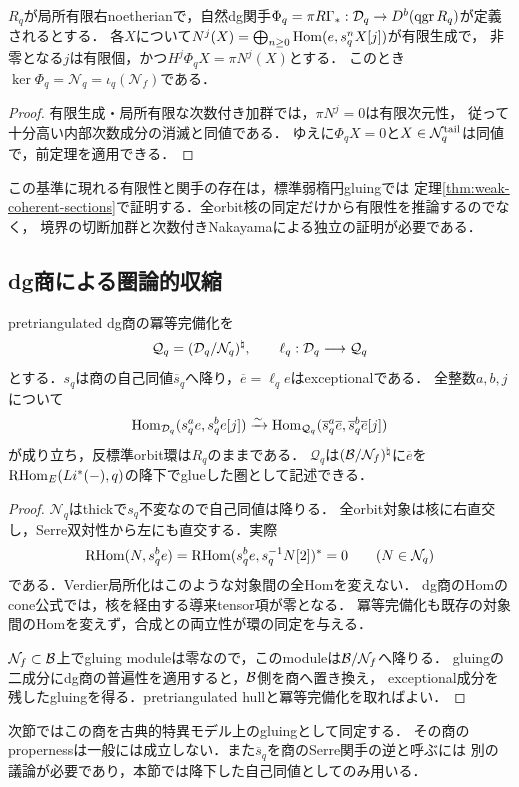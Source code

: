\begin{proposition}[coherent導来切断の核を認識する基準]\label{prop:weak-coherent-kernel}
$R_q$が局所有限右noetherianで，自然dg関手$\Phi_q=\pi R\Gamma_*:\mathcal D_q\to D^b(\operatorname{qgr} R_q)$が定義されるとする．
各$X$について$N^j(X)=\bigoplus_{n\ge0}\operatorname{Hom}(e,s_q^nX[j])$が有限生成で，
非零となる$j$は有限個，かつ$H^j\Phi_qX=\pi N^j(X)$とする．
このとき$\ker\Phi_q=\mathcal N_q=\iota_q(\mathcal N_f)$である．
\end{proposition}
\begin{proof}
有限生成・局所有限な次数付き加群では，$\pi N^j=0$は有限次元性，
従って十分高い内部次数成分の消滅と同値である．
ゆえに$\Phi_qX=0$と$X\in\mathcal N_q^{\rm tail}$は同値で，前定理を適用できる．
\end{proof}
この基準に現れる有限性と関手の存在は，標準弱楕円gluingでは
定理\ref{thm:weak-coherent-sections}で証明する．全orbit核の同定だけから有限性を推論するのでなく，
境界の切断加群と次数付きNakayamaによる独立の証明が必要である．

\subsection{dg商による圏論的収縮}
\begin{proposition}[orbit環を変えない圏論的収縮]\label{prop:zero-dg-quotient}
pretriangulated dg商の冪等完備化を
\[
 \mathcal Q_q=(\mathcal D_q/\mathcal N_q)^\natural,\qquad \ell_q:\mathcal D_q\longrightarrow\mathcal Q_q
\]
とする．$s_q$は商の自己同値$\overline s_q$へ降り，$\overline e=\ell_qe$はexceptionalである．
全整数$a,b,j$について
\[
 \operatorname{Hom}_{\mathcal D_q}(s_q^ae,s_q^be[j])
 \xrightarrow{\sim}
 \operatorname{Hom}_{\mathcal Q_q}(\overline s_q^a\overline e,\overline s_q^b\overline e[j])
\]
が成り立ち，反標準orbit環は$R_q$のままである．
$\mathcal Q_q$は$(\mathcal B/\mathcal N_f)^\natural$に$\overline e$を
$\operatorname{RHom}_E(Li^*(-),q)$の降下でglueした圏として記述できる．
\end{proposition}
\begin{proof}
$\mathcal N_q$はthickで$s_q$不変なので自己同値は降りる．
全orbit対象は核に右直交し，Serre双対性から左にも直交する．実際
\[
 \operatorname{RHom}(N,s_q^be)=\operatorname{RHom}(s_q^be,s_q^{-1}N[2])^*=0
 \qquad(N\in\mathcal N_q)
\]
である．Verdier局所化はこのような対象間の全Homを変えない．
dg商のHomのcone公式\cite[\S1.3.1]{DrinfeldWalls}では，核を経由する導来tensor項が零となる．
冪等完備化も既存の対象間のHomを変えず，合成との両立性が環の同定を与える．

$\mathcal N_f\subset\mathcal B$上でgluing moduleは零なので，このmoduleは$\mathcal B/\mathcal N_f$へ降りる．
gluingの二成分にdg商の普遍性を適用すると，$\mathcal B$側を商へ置き換え，
exceptional成分を残したgluingを得る．pretriangulated hullと冪等完備化を取ればよい．
\end{proof}
次節ではこの商を古典的特異モデル上のgluingとして同定する．
その商のpropernessは一般には成立しない．また$\overline s_q$を商のSerre関手の逆と呼ぶには
別の議論が必要であり，本節では降下した自己同値としてのみ用いる．

